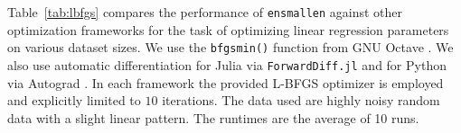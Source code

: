 \documentclass[twoside,11pt]{article}
\begin{document}


Table~\ref{tab:lbfgs} compares the performance
of {\tt ensmallen} against other optimization frameworks
for the task of optimizing linear regression parameters on various dataset sizes.
We use the {\tt bfgsmin()} function from GNU Octave \citep{octave}.
We also use automatic differentiation for Julia via {\tt ForwardDiff.jl} \citep{RevelsLubinPapamarkou2016}
and for Python via Autograd \citep{maclaurin2015autograd}.
In each framework the provided L-BFGS optimizer is employed
and explicitly limited to $10$ iterations.
The data used are highly noisy random data with a slight linear pattern.
The runtimes are the average of 10 runs.





\end{document}

